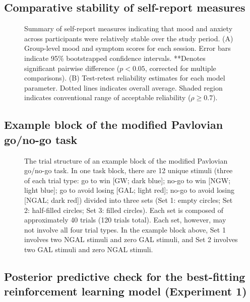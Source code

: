 \documentclass[a4paper,12pt]{article}
\begin{document}
\begin{refsection}[supp]
\clearpage
\subsection*{Comparative stability of self-report measures}

\begin{figure}[h]
    \centerline{}
    \caption{Summary of self-report measures indicating that mood and anxiety across participants were relatively stable over the study period. (A) Group-level mood and symptom scores for each session. Error bars indicate 95\% bootstrapped confidence intervals. **Denotes significant pairwise difference ($p < 0.05$, corrected for multiple comparisons). (B) Test-retest reliability estimates for each model parameter. Dotted lines indicates overall average. Shaded region indicates conventional range of acceptable reliability ($\rho \geq 0.7$).}
    \label{fig:figS05}
\end{figure}

\break
\subsection*{Example block of the modified Pavlovian go/no-go task}

\begin{figure}[h]
    \centerline{}
    \caption{The trial structure of an example block of the modified Pavlovian go/no-go task. In one task block, there are 12 unique stimuli (three of each trial type: go to win [GW; dark blue]; no-go to win [NGW; light blue]; go to avoid losing [GAL; light red]; no-go to avoid losing [NGAL; dark red]) divided into three sets (Set 1: empty circles; Set 2: half-filled circles; Set 3: filled circles). Each set is composed of approximately 40 trials (120 trials total). Each set, however, may not involve all four trial types. In the example block above, Set 1 involves two NGAL stimuli and zero GAL stimuli, and Set 2 involves two GAL stimuli and zero NGAL stimuli.}
    \label{fig:figS01}
\end{figure}

\break
\subsection*{Posterior predictive check for the best-fitting reinforcement learning model (Experiment 1)}


\end{refsection}
\end{document}
